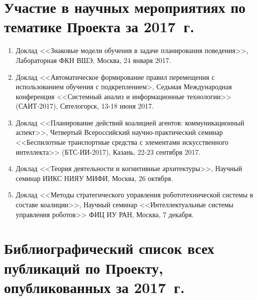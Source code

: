 \documentclass[12pt]{report}
\begin{document}
	
	\section*{Участие в научных мероприятиях по тематике Проекта за 2017~г.}
	\begin{enumerate}
		\item Доклад <<Знаковые модели обучения в задаче планирования поведения>>, Лабораторная ФКН ВШЭ, Москва, 24 января 2017.
		\item Доклад <<Автоматическое формирование правил перемещения с использованием обучения с подкреплением>, Седьмая Международная конференция <<Системный анализ и информационные технологии>> (САИТ-2017), Свтелогорск, 13-18 июня 2017.
		\item Доклад <<Планирование действий коалицией агентов: коммуникационный аспект>>, Четвертый Всероссийский научно-практический семинар <<Беспилотные транспортные средства с элементами искусственного интеллекта>> (БТС-ИИ-2017), Казань, 22-23 сентября 2017.
		\item Доклад <<Теория деятельности и когнитивные архитектуры>>, Научный семинар ИИКС НИЯУ МИФИ, Москва, 26 октября.
		\item Доклад <<Методы стратегического управления робототехнической  системы в составе коалиции>>, Научный семинар <<Интеллектуальные системы управления роботов>> ФИЦ ИУ РАН, Москва, 7 декабря.
	\end{enumerate}
	
	\section*{Библиографический список всех публикаций по Проекту, опубликованных за 2017~г.}
	\nocite{*}
	\printbibliography[heading=none,keyword={mypub, myconf},resetnumbers=true]
\end{document}
